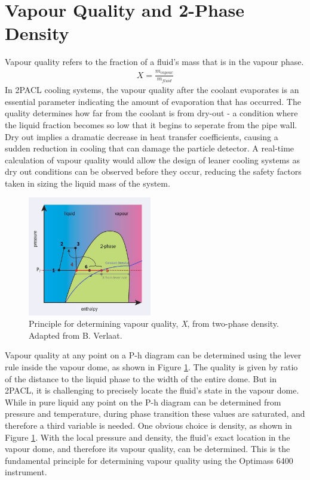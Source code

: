 \documentclass{report}
\begin{document}
\section{Vapour Quality and 2-Phase Density}
\FloatBarrier
Vapour quality refers to the fraction of a fluid's mass that is in the vapour phase.
\begin{eqnarray}
X=\frac{m_{vapour}}{m_{fluid}}
\end{eqnarray}
In 2PACL cooling systems, the vapour quality after the coolant evaporates is an essential parameter indicating the amount of evaporation that has occurred. The quality determines how far from the coolant is from dry-out - a condition where the liquid fraction becomes so low that it begins to seperate from the pipe wall. Dry out implies a dramatic decrease in heat transfer coefficients, causing a sudden reduction in cooling that can damage the particle detector. A real-time calculation of vapour quality would allow the design of leaner cooling systems as dry out conditions can be observed before they occur, reducing the safety factors taken in sizing the liquid mass of the system.\\
\FloatBarrier
\begin{figure}
\vspace{-1.5cm}
\begin{center}
\includegraphics[width=0.48\textwidth]{densityMethod.jpg}
\end{center}
\caption{Principle for determining vapour quality, \textit{X}, from two-phase density. Adapted from B. Verlaat. \cite{CERN courier}}
\label{fig:densityMethod}
\end{figure}
\FloatBarrier
Vapour quality at any point on a P-h diagram can be determined using the lever rule inside the vapour dome, as shown in Figure \ref{fig:densityMethod}. The quality is given by ratio of the distance to the liquid phase to the width of the entire dome. But in 2PACL, it is challenging to precisely locate the fluid's state in the vapour dome. \\
While in pure liquid any point on the P-h diagram can be determined from pressure and temperature, during phase transition these values are saturated, and therefore a third variable is needed. One obvious choice is density, as shown in Figure \ref{fig:densityMethod}. With the local pressure and density, the fluid's exact location in the vapour dome, and therefore its vapour quality, can be determined. This is the fundamental principle for determining vapour quality using the Optimass 6400 instrument.
\end{document}
